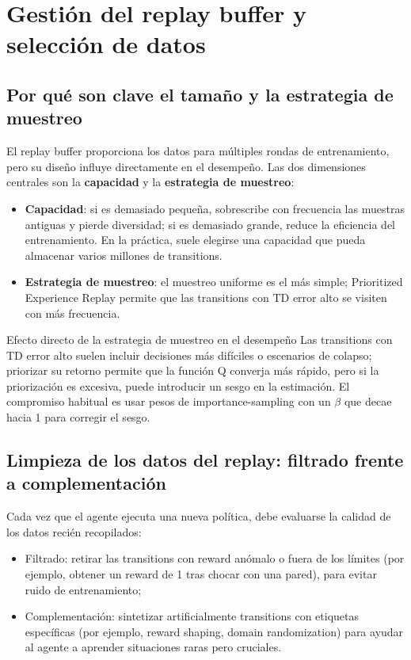 \section{Gestión del replay buffer y selección de datos}

\subsection{Por qué son clave el tamaño y la estrategia de muestreo}

El replay buffer proporciona los datos para múltiples rondas de entrenamiento, pero su diseño influye directamente en el desempeño. Las dos dimensiones centrales son la \textbf{capacidad} y la \textbf{estrategia de muestreo}:

\begin{itemize}
    \item \textbf{Capacidad}: si es demasiado pequeña, sobrescribe con frecuencia las muestras antiguas y pierde diversidad; si es demasiado grande, reduce la eficiencia del entrenamiento. En la práctica, suele elegirse una capacidad que pueda almacenar varios millones de transitions.
    \item \textbf{Estrategia de muestreo}: el muestreo uniforme es el más simple; Prioritized Experience Replay permite que las transitions con TD error alto se visiten con más frecuencia.
\end{itemize}

\begin{knowledgebox}{Efecto directo de la estrategia de muestreo en el desempeño}
Las transitions con TD error alto suelen incluir decisiones más difíciles o escenarios de colapso; priorizar su retorno permite que la función Q converja más rápido, pero si la priorización es excesiva, puede introducir un sesgo en la estimación. El compromiso habitual es usar pesos de importance-sampling con un $\beta$ que decae hacia 1 para corregir el sesgo.
\end{knowledgebox}

\subsection{Limpieza de los datos del replay: filtrado frente a complementación}

Cada vez que el agente ejecuta una nueva política, debe evaluarse la calidad de los datos recién recopilados:

\begin{itemize}
    \item Filtrado: retirar las transitions con reward anómalo o fuera de los límites (por ejemplo, obtener un reward de 1 tras chocar con una pared), para evitar ruido de entrenamiento;
    \item Complementación: sintetizar artificialmente transitions con etiquetas específicas (por ejemplo, reward shaping, domain randomization) para ayudar al agente a aprender situaciones raras pero cruciales.
\end{itemize}

